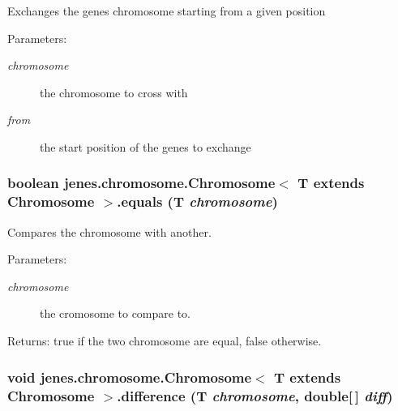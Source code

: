 Exchanges the genes chromosome starting from a given position 

\begin{Desc}
\item[Parameters:]
\begin{description}
\item[{\em chromosome}]the chromosome to cross with \item[{\em from}]the start position of the genes to exchange \end{description}
\end{Desc}
\hypertarget{interfacejenes_1_1chromosome_1_1_chromosome_3_01_t_01extends_01_chromosome_01_4_fa9dc889ff75457240750c802a5024db}{
\subsubsection[equals]{\setlength{\rightskip}{0pt plus 5cm}boolean jenes.chromosome.Chromosome$<$ T extends Chromosome $>$.equals (T {\em chromosome})}}
\label{interfacejenes_1_1chromosome_1_1_chromosome_3_01_t_01extends_01_chromosome_01_4_fa9dc889ff75457240750c802a5024db}


Compares the chromosome with another.

\begin{Desc}
\item[Parameters:]
\begin{description}
\item[{\em chromosome}]the cromosome to compare to. \end{description}
\end{Desc}
\begin{Desc}
\item[Returns:]true if the two chromosome are equal, false otherwise. \end{Desc}
\hypertarget{interfacejenes_1_1chromosome_1_1_chromosome_3_01_t_01extends_01_chromosome_01_4_7f4ba26864bc54607635b608be6a1e1d}{
\subsubsection[difference]{\setlength{\rightskip}{0pt plus 5cm}void jenes.chromosome.Chromosome$<$ T extends Chromosome $>$.difference (T {\em chromosome}, \/  double\mbox{[}$\,$\mbox{]} {\em diff})}}
\label{interfacejenes_1_1chromosome_1_1_chromosome_3_01_t_01extends_01_chromosome_01_4_7f4ba26864bc54607635b608be6a1e1d}


